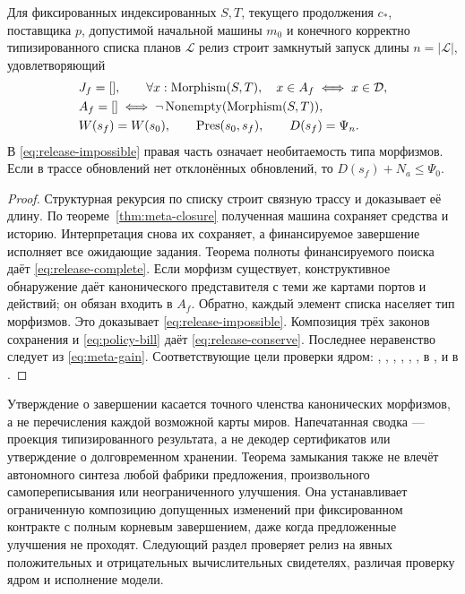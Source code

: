 \begin{theorem}\label{thm:release}
Для фиксированных индексированных $S,T$, текущего продолжения $c_*$, поставщика $p$, допустимой начальной машины $m_0$ и конечного корректно типизированного списка планов $\mathcal L$ релиз строит замкнутый запуск длины $n=|\mathcal L|$, удовлетворяющий
\begin{align}
 &J_f=[] ,\qquad \forall x:\mathrm{Morphism}(S,T),\quad x\in A_f\iff x\in\mathcal D,\label{eq:release-complete}\\
 &A_f=[]\iff \neg\operatorname{Nonempty}(\mathrm{Morphism}(S,T)),\label{eq:release-impossible}\\
 &W(s_f)=W(s_0),\qquad \operatorname{Pres}(s_0,s_f),\qquad D(s_f)=\Psi_n.\label{eq:release-conserve}
\end{align}
В \eqref{eq:release-impossible} правая часть означает необитаемость типа морфизмов. Если в трассе обновлений нет отклонённых обновлений, то $D(s_f)+N_a\le\Psi_0$.
\end{theorem}
\begin{proof}
Структурная рекурсия по списку строит связную трассу и доказывает её длину. По теореме~\ref{thm:meta-closure} полученная машина сохраняет средства и историю. Интерпретация снова их сохраняет, а финансируемое завершение исполняет все ожидающие задания. Теорема полноты финансируемого поиска даёт \eqref{eq:release-complete}. Если морфизм существует, конструктивное обнаружение даёт канонического представителя с теми же картами портов и действий; он обязан входить в $A_f$. Обратно, каждый элемент списка населяет тип морфизмов. Это доказывает \eqref{eq:release-impossible}. Композиция трёх законов сохранения и \eqref{eq:policy-bill} даёт \eqref{eq:release-conserve}. Последнее неравенство следует из \eqref{eq:meta-gain}. Соответствующие цели проверки ядром: , , , , , ,  в , и  в .
\end{proof}

Утверждение о завершении касается точного членства канонических морфизмов, а не перечисления каждой возможной карты миров. Напечатанная сводка --- проекция типизированного результата, а не декодер сертификатов или утверждение о долговременном хранении. Теорема замыкания также не влечёт автономного синтеза любой фабрики предложения, произвольного самопереписывания или неограниченного улучшения. Она устанавливает ограниченную композицию допущенных изменений при фиксированном контракте с полным корневым завершением, даже когда предложенные улучшения не проходят. Следующий раздел проверяет релиз на явных положительных и отрицательных вычислительных свидетелях, различая проверку ядром и исполнение модели.
